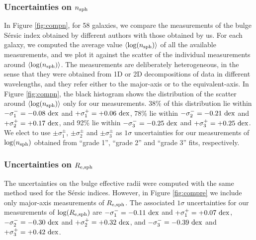 \documentclass[preprint2]{emulateapj}
\begin{document}
\subsubsection{Uncertainties on $n_{\rm sph}$}
In Figure \ref{fig:compn}, for 58 galaxies, 
we compare the measurements of the bulge S\'ersic index obtained by different authors 
with those obtained by us. 
For each galaxy, we computed the average value $\langle \log(n_{\rm sph}) \rangle$ of all the available measurements, 
and we plot it against the scatter of the individual measurements around $\langle \log(n_{\rm sph}) \rangle$.
The measurements are deliberately heterogeneous, 
in the sense that they were obtained from 1D or 2D decompositions of data in different wavelengths, 
and they refer either to the major-axis or to the equivalent-axis.
In Figure \ref{fig:compn}, the black histogram shows the distribution of the scatter around $\langle \log(n_{\rm sph}) \rangle$ 
only for our measurements. 
38\% of this distribution lie within $-\sigma_1^- = -0.08~\rm dex$ and $+\sigma_1^+ = +0.06~\rm dex$, 
78\% lie within $-\sigma_2^- = -0.21~\rm dex$ and $+\sigma_2^+ = +0.17~\rm dex$,
and 92\% lie within $-\sigma_3^- = -0.25~\rm dex$ and $+\sigma_3^+ = +0.25~\rm dex$. 
We elect to use $\pm \sigma_1^\pm$, $\pm \sigma_2^\pm$ and $\pm \sigma_3^\pm$ as $1\sigma$ uncertainties 
for our measurements of $\log(n_{\rm sph})$ obtained from ``grade 1'', ``grade 2'' and ``grade 3'' fits, respectively. \\

\subsubsection{Uncertainties on $R_{\rm e,sph}$}
The uncertainties on the bulge effective radii were computed with the same method used for the S\'ersic indices. 
However, in Figure \ref{fig:compre} we include only major-axis measurements of $R_{\rm e,sph}$. 
The associated $1\sigma$ uncertainties for our measurements of $\log(R_{\rm e,sph})$ are 
$-\sigma_1^- = -0.11~\rm dex$ and $+\sigma_1^+ = +0.07~\rm dex$, 
$-\sigma_2^- = -0.30~\rm dex$ and $+\sigma_2^+ = +0.32~\rm dex$,
and $-\sigma_3^- = -0.39~\rm dex$ and $+\sigma_3^+ = +0.42~\rm dex$. 
\end{document}
